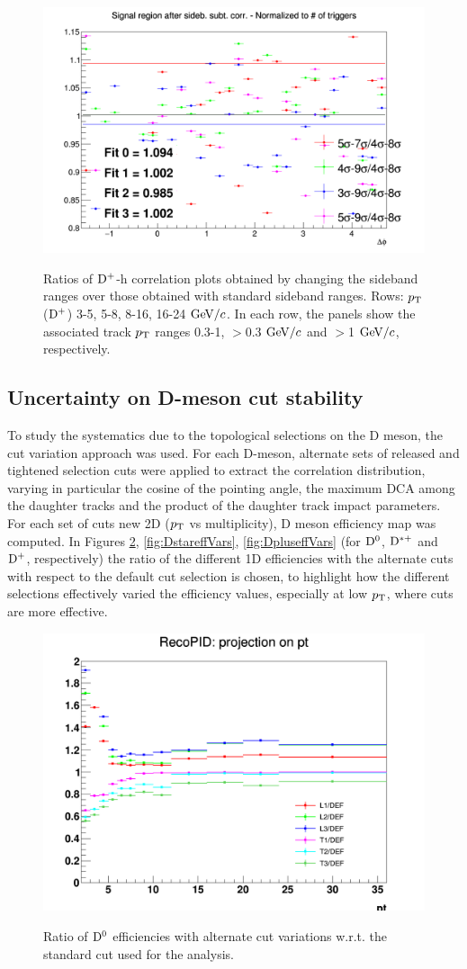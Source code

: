 \begin{figure}
{\includegraphics[width=0.31\linewidth]{figures/Systematics/Dplus/Bkg/Ratio_AzimCorrDistr_Dplus_Canvas_PtIntBins13to13_PoolInt_thr1dotto99dot.png}}
 \caption{Ratios of ${\rm D^+}$-h correlation plots obtained by changing the sideband ranges over those obtained with standard sideband ranges. Rows: $p_{\rm T}$(${\rm D^+}$) 3-5, 5-8, 8-16, 16-24 $\mathrm{GeV}/c$. In each row, the panels show the associated track $p_{\rm T}$ ranges 0.3-1, $>$0.3 $\mathrm{GeV}/c$ and $>$1 $\mathrm{GeV}/c$, respectively.}
\label{fig:Syst_DplusBkg}
\end{figure}

\subsection{Uncertainty on D-meson cut stability}
To study the systematics due to the topological selections on the D meson, the cut variation approach was used. For each D-meson, alternate sets of released and tightened selection cuts were applied to extract the correlation distribution, varying in particular the cosine of the pointing angle, the maximum DCA among the daughter tracks and the product of the daughter track impact parameters. For each set of cuts new 2D ($p_{\rm T}$ vs multiplicity), D meson efficiency map was computed.
In Figures \ref{fig:D0effVars}, \ref{fig:DstareffVars}, \ref{fig:DpluseffVars} (for ${\rm D^0}$, ${\rm D^{*+}}$ and ${\rm D^+}$, respectively) the ratio of the different 1D efficiencies with the alternate cuts with respect to the default cut selection is chosen, to highlight how the different selections effectively varied the efficiency values, especially at low $p_{\rm T}$, where cuts are more effective.

\begin{figure}[h]
\centering
{\includegraphics[width=.7\linewidth]{figures/Systematics/Dzero/CutVar/RatioPromptEff1DMap.png}}
\caption{Ratio of ${\rm D^0}$ efficiencies with alternate cut variations w.r.t. the standard cut used for the analysis.}
\label{fig:D0effVars}
\end{figure}


